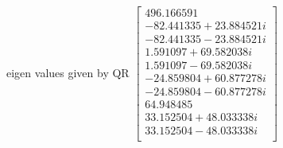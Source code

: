 \documentclass[pdflatex,sn-mathphys-num]{sn-jnl}
\begin{document}
\begin{enumerate}
eigen values given by QR $\begin{bmatrix} 
496.166591\\
-82.441335 + 23.884521i \\
-82.441335 - 23.884521i\\
1.591097 + 69.582038i\\
1.591097 - 69.582038i\\
-24.859804 + 60.877278i\\
-24.859804 - 60.877278i\\
64.948485\\
33.152504 + 48.033338i\\
33.152504 - 48.033338i\\
\end{bmatrix}$
\end{enumerate}

\fi
\end{document}
